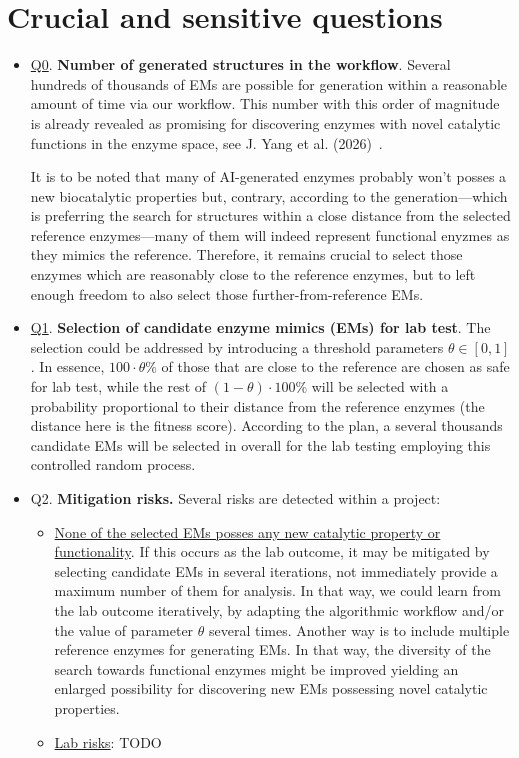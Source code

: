 \documentclass[runningheads]{llncs}
\begin{document}
\newpage

\section{Crucial and sensitive questions}

\begin{itemize}
	\item \underline{Q0}. \textbf{Number of generated structures in the workflow}. Several hundreds of thousands of EMs are possible for generation within a reasonable amount of time via our workflow. This number with this order of magnitude is already revealed as promising for discovering enzymes with novel catalytic functions in the enzyme space, see J. Yang et al. (2026)~\cite{yang2026}.
	
	It is to be noted that many of AI-generated enzymes probably won't posses a new biocatalytic properties but, contrary, according to the generation---which is preferring the search for structures  within a close distance from the selected reference enzymes---many of them will indeed represent functional enyzmes as they mimics the reference. Therefore, it remains crucial to select those enzymes which are reasonably close to the reference enzymes, but to left enough freedom to also select those further-from-reference EMs. \\
	
	\item \underline{Q1}. \textbf{Selection of candidate enzyme mimics (EMs) for lab test}. The selection could be addressed by introducing a threshold parameters $\theta \in [0, 1]$. In essence, $100\cdot \theta \%$ of those that are close to the reference are chosen as safe for lab test, while the rest of $(1-\theta)\cdot 100\%$ will be selected  with a probability proportional to their distance from the reference enzymes (the distance here is the fitness score). According to the plan, a several thousands candidate EMs will be selected in overall for the lab testing employing this controlled random process. \\
	
	\item Q2.\textbf{ Mitigation risks.}  Several risks are detected within a project:
	
	\begin{itemize}
		\item \underline{None of the selected EMs posses any new catalytic property or functionality}. If this occurs as the lab outcome, it may be mitigated by selecting candidate EMs in several iterations, not immediately provide a maximum number of them for analysis. In that way, we could learn from the lab outcome iteratively, by adapting the algorithmic workflow and/or the value of parameter $\theta$ several times. Another way is to include multiple reference enzymes for generating EMs. In that way, the diversity of the search towards functional enzymes  might be improved yielding an enlarged possibility for discovering new EMs possessing novel catalytic properties.
		  
		\item \underline{Lab risks}: TODO
	\end{itemize}
\end{itemize}
\end{document}
